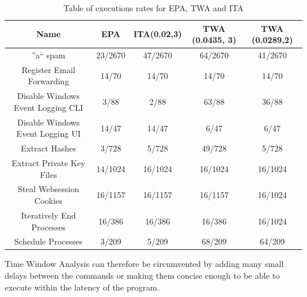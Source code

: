 \begin{table}[h]
\centering
\begin{tabular}{|c|c|c|c|c|}
\hline
Name & EPA &  ITA(0.02,3) & TWA (0.0435, 3) & TWA (0.0289,2) \\
\hline
''a`` spam & 23/2670 & 47/2670 & 64/2670 & 41/2670 \\
\hline
Register Email Forwarding & 14/70 & 14/70 & 14/70 & 14/70 \\
\hline
Disable Windows Event Logging CLI & 3/88 & 2/88 & 63/88 & 36/88 \\
\hline
Disable Windows Event Logging UI & 14/47 & 14/47 & 6/47 & 6/47 \\
\hline
Extract Hashes & 3/728 & 5/728 & 49/728 & 5/728 \\
\hline
Extract Private Key Files & 14/1024 & 16/1024 & 16/1024 & 16/1024 \\
\hline
Steal Websession Cookies & 16/1157 & 16/1157 & 16/1157 & 16/1024 \\
\hline
Iteratively End Processes & 16/386 & 16/386 & 16/386 & 16/1024 \\
\hline
Schedule Processes & 3/209 & 5/209 & 68/209 & 64/209 \\
\hline
\end{tabular}
\caption{Table of executions rates for EPA, TWA and ITA}
\end{table}

Time Window Analysis can therefore be circumvented by adding many small delays between the commands or making them concise enough to be able to execute within the latency of the program. \\









